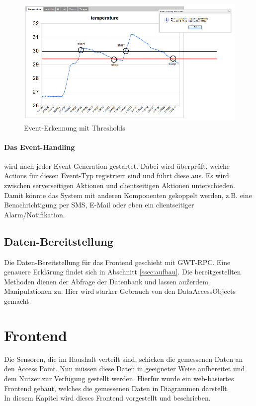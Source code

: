 \documentclass[12pt,a4paper,twoside]{article}
\begin{document}
\begin{figure}[htbp]
   \centering
   \includegraphics[width=12cm]{fig/threshold.png}
   \caption{Event-Erkennung mit Thresholds}
   \label{event-detection}
\end{figure}

\paragraph{Das Event-Handling} wird nach jeder Event-Generation gestartet. Dabei wird überprüft, welche Actions für diesen Event-Typ registriert sind und führt diese aus. Es wird zwischen serverseitigen Aktionen und clientseitigen Aktionen unterschieden. Damit könnte das System mit anderen Komponenten gekoppelt werden, z.B. eine Benachrichtigung per SMS, E-Mail oder eben ein clientseitiger Alarm/Notifikation.

\subsection{Daten-Bereitstellung}Die Daten-Bereitstellung für das Frontend geschieht mit GWT-RPC. Eine genauere Erklärung findet sich in Abschnitt \ref{ssec:aufbau}. Die bereitgestellten Methoden dienen der Abfrage der Datenbank und lassen außerdem Manipulationen zu. Hier wird starker Gebrauch von den DataAccessObjects gemacht.

\section{Frontend}\label{sec:frontend}
Die Sensoren, die im Haushalt verteilt sind, schicken die gemessenen Daten an den Access Point. Nun müssen diese Daten in geeigneter Weise aufbereitet und dem Nutzer zur Verfügung gestellt werden. Hierfür wurde ein web-basiertes Frontend gebaut, welches die gemessenen Daten in Diagrammen darstellt. \\
In diesem Kapitel wird dieses Frontend vorgestellt und beschrieben.
\end{document}
